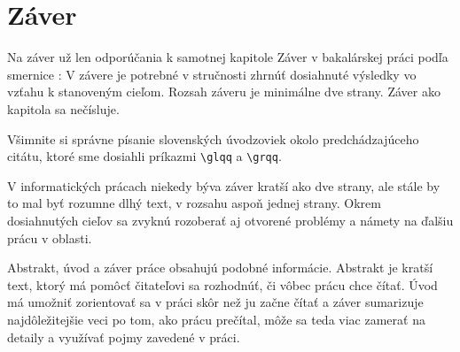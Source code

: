 \chapter*{Záver}  %

Na záver už len odporúčania k samotnej kapitole Záver v bakalárskej
práci podľa smernice \cite{smernica}:  \glqq{}V závere je potrebné v
stručnosti zhrnúť dosiahnuté výsledky vo vzťahu k stanoveným
cieľom. Rozsah záveru je minimálne dve strany. Záver ako kapitola sa
nečísluje.\grqq{}

Všimnite si správne písanie slovenských úvodzoviek okolo
predchádzajúceho citátu, ktoré sme dosiahli príkazmi \verb'\glqq' a
\verb'\grqq'.

V informatických prácach niekedy býva záver kratší ako dve strany, ale
stále by to mal byť rozumne dlhý text, v rozsahu aspoň jednej strany.
Okrem dosiahnutých cieľov sa zvyknú rozoberať aj otvorené problémy a
námety na ďalšiu prácu v oblasti.

Abstrakt, úvod a záver práce obsahujú podobné informácie. Abstrakt je
kratší text, ktorý má pomôcť čitateľovi sa rozhodnúť, či vôbec prácu
chce čítať. Úvod má umožniť zorientovať sa v práci skôr než ju začne
čítať a záver sumarizuje najdôležitejšie veci po tom, ako prácu
prečítal, môže sa teda viac zamerať na detaily a využívať pojmy
zavedené v práci.


